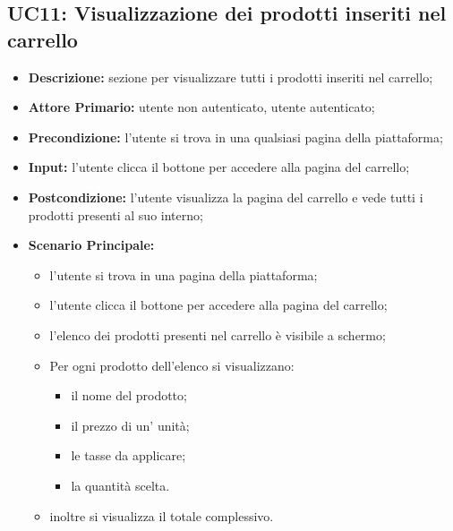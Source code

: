 \subsection{UC11: Visualizzazione dei prodotti inseriti nel carrello}
\label{sec:UC11}
\begin{itemize}
    \item \textbf{Descrizione:} sezione per visualizzare tutti i prodotti inseriti nel carrello;
    \item \textbf{Attore Primario:} utente non autenticato, utente autenticato;
    \item \textbf{Precondizione:}  l'utente si trova in una qualsiasi pagina della piattaforma;
    \item \textbf{Input:} l'utente clicca il bottone per accedere alla pagina del carrello;
    \item \textbf{Postcondizione:} l'utente visualizza la pagina del carrello e vede tutti i prodotti presenti al suo interno;
    \item \textbf{Scenario Principale:}
          \begin{itemize}
              \item l'utente si trova in una pagina della piattaforma;
              \item l'utente clicca il bottone per accedere alla pagina del carrello;
              \item l'elenco dei prodotti presenti nel carrello è visibile a schermo;
              \item Per ogni prodotto dell'elenco si visualizzano:
                    \begin{itemize}
                        \item il nome del prodotto;
                        \item il prezzo di un' unità;
                        \item le tasse da applicare;
                        \item la quantità scelta.
                    \end{itemize}
              \item inoltre si visualizza il totale complessivo.
          \end{itemize}
\end{itemize}